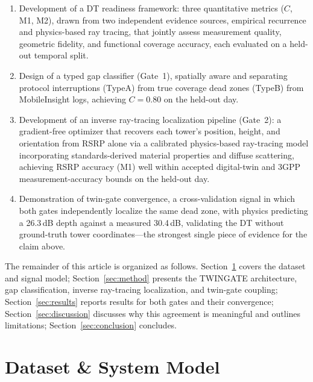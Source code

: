 \documentclass[conference]{IEEEtran}
\begin{document}
\begin{enumerate}
  \item Development of a DT readiness framework: three quantitative
        metrics ($C$, M1, M2), drawn from two independent evidence
        sources, empirical recurrence and physics-based ray tracing,
        that jointly assess measurement quality, geometric fidelity, and
        functional coverage accuracy, each evaluated on a held-out
        temporal split.
  \item Design of a typed gap classifier (Gate~1), spatially aware and
        separating protocol interruptions (TypeA) from true coverage
        dead zones (TypeB) from MobileInsight logs, achieving
        $C=0.80$ on the held-out day.
  \item Development of an inverse ray-tracing localization pipeline
        (Gate~2): a gradient-free optimizer that recovers each tower's
        position, height, and orientation from RSRP alone via a
        calibrated physics-based ray-tracing model incorporating
        standards-derived material properties and diffuse scattering,
        achieving RSRP accuracy (M1) well within accepted digital-twin
        and 3GPP measurement-accuracy bounds on the held-out day.
  \item Demonstration of twin-gate convergence, a cross-validation
        signal in which both gates independently localize the same
        dead zone, with physics predicting a 26.3\,dB depth against a
        measured 30.4\,dB, validating the DT without ground-truth
        tower coordinates---the strongest single piece of evidence for
        the claim above.
\end{enumerate}

The remainder of this article is organized as follows.
Section~\ref{sec:dataset} covers the dataset and signal model;
Section~\ref{sec:method} presents the TWINGATE architecture, gap
classification, inverse ray-tracing localization, and twin-gate
coupling; Section~\ref{sec:results} reports results for both gates and
their convergence; Section~\ref{sec:discussion} discusses why this
agreement is meaningful and outlines limitations;
Section~\ref{sec:conclusion} concludes.

\section{Dataset \& System Model}
\label{sec:dataset}
\end{document}
